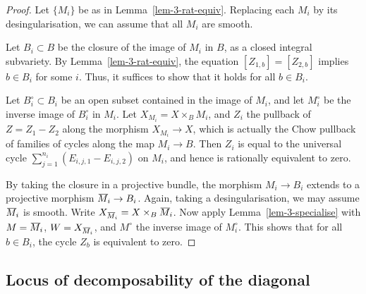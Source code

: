 \begin{proof}
    \def\Mibar{\mspace{2mu}\overline{\smash{\mspace{-2mu}M}\vphantom{t}}\mspace{-1mu}\vphantom{t}_i}
    Let $\{ M_i \}$ be as in Lemma~\ref{lem-3-rat-equiv}.
    Replacing each $M_i$ by its desingularisation, we can assume
    that all $M_i$ are smooth.

    Let $B_i \subset B$ be the closure of the image of $M_i$ in $B$,
    as a closed integral subvariety.
    By Lemma~\ref{lem-3-rat-equiv}, the equation $[Z_{1,b}] = [Z_{2,b}]$
    implies $b \in B_i$ for some $i$. 
    Thus, it suffices to show that it holds for all $b \in B_i$.

    Let $B_i^\circ \subset B_i$ be an open subset contained in the image of $M_i$,
    and let $M_i^\circ$ be the inverse image of $B_i^\circ$ in $M_i$.
    Let $X_{M_i} = X \times_B M_i$, and $Z_i$ the pullback of $Z = Z_1 - Z_2$
    along the morphism $X_{M_i} \to X$, 
    which is actually the Chow pullback of families of cycles along the map $M_i \to B$.
    Then $Z_i$ is equal to the universal cycle $\sum_{j=1}^{n_i} (E_{i,j,1} - E_{i,j,2})$ on $M_i$,
    and hence is rationally equivalent to zero.

    By taking the closure in a projective bundle, 
    the morphism $M_i \to B_i$ extends to a projective morphism $\Mibar \to B_i$.
    Again, taking a desingularisation, we may assume $\Mibar$ is smooth.
    Write $X_{\Mibar} = X \times_B \Mibar$.
    Now apply Lemma~\ref{lem-3-specialise} with $M = \Mibar$, $W = X_{\Mibar}$,
    and $M^\circ$ the inverse image of $M_i^\circ$. 
    This shows that for all $b \in B_i$, the cycle $Z_b$ is equivalent to zero.
\end{proof}


\subsection{Locus of decomposability of the diagonal}

